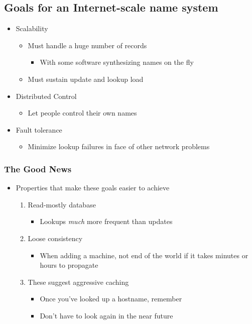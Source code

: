 \subsection{Goals for an Internet-scale name system}
\begin{itemize}[nosep]
    \item Scalability
          \begin{itemize}[nosep]
              \item Must handle a huge number of records
                    \begin{itemize}[nosep]
                        \item With some software synthesizing names on the fly
                    \end{itemize}
              \item Must sustain update and lookup load
          \end{itemize}
    \item Distributed Control
          \begin{itemize}[nosep]
              \item Let people control their own names
          \end{itemize}
    \item Fault tolerance
          \begin{itemize}[nosep]
              \item Minimize lookup failures in face of other network problems
          \end{itemize}
\end{itemize}
\subsubsection{The Good News}
\begin{itemize}[nosep]
    \item Properties that make these goals easier to achieve
          \begin{enumerate}[nosep]
              \item Read-mostly database
                    \begin{itemize}[nosep]
                        \item Lookups \emph{much} more frequent than updates
                    \end{itemize}
              \item Loose consistency
                    \begin{itemize}[nosep]
                        \item When adding a machine, not end of the world if it takes minutes or hours to propagate
                    \end{itemize}
              \item These suggest aggressive caching
                    \begin{itemize}[nosep]
                        \item Once you've looked up a hostname, remember
                        \item Don't have to look again in the near future
                    \end{itemize}
          \end{enumerate}
\end{itemize}
